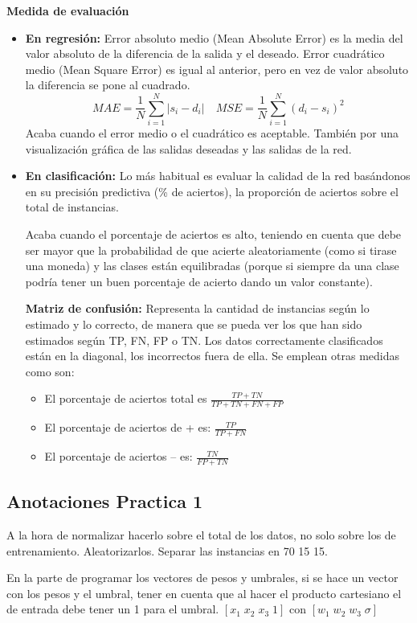 \documentclass[12pt, twoside, openright]{report} %
\begin{document}
\textbf{Medida de evaluación}
\begin{itemize}
	\item \textbf{En regresión:} Error absoluto medio (Mean Absolute Error) es la media del valor absoluto de la diferencia de la salida y el deseado. Error cuadrático medio (Mean Square Error) es igual al anterior, pero en vez de valor absoluto la diferencia se pone al cuadrado.
	      $$MAE=\frac 1 N \sum^N_{i=1} |s_i-d_i| \quad MSE=\frac 1 N \sum^N_{i=1} (d_i-s_i)^2$$
	      Acaba cuando el error medio o el cuadrático es aceptable. También por una visualización gráfica de las salidas deseadas y las salidas de la red.
	\item \textbf{En clasificación:} Lo más habitual es evaluar la calidad de la red basándonos en su precisión predictiva (\% de aciertos), la proporción de aciertos sobre el total de instancias.

	      Acaba cuando el porcentaje de aciertos es alto, teniendo en cuenta que debe ser mayor que la probabilidad de que acierte aleatoriamente (como si tirase una moneda) y las clases están equilibradas (porque si siempre da una clase podría tener un buen porcentaje de acierto dando un valor constante).

	      \textbf{Matriz de confusión:} Representa la cantidad de instancias según lo estimado y lo correcto, de manera que se pueda ver los que han sido estimados según TP, FN, FP o TN. Los datos correctamente clasificados están en la diagonal, los incorrectos fuera de ella. Se emplean otras medidas como son:
	      \begin{itemize}
		      \item El porcentaje de aciertos total es $\frac {TP+TN} {TP+TN+FN+FP}$
		      \item El porcentaje de aciertos de + es: $\frac {TP} {TP+FN}$
		      \item El porcentaje de aciertos – es: $\frac {TN} {FP+TN}$
	      \end{itemize}

\end{itemize}

\subsection{Anotaciones Practica 1}
A la hora de normalizar hacerlo sobre el total de los datos, no solo sobre los de entrenamiento.
Aleatorizarlos.
Separar las instancias en 70 15 15.

En la parte de programar los vectores de pesos y umbrales, si se hace un vector con los pesos y el umbral, tener en cuenta que al hacer el producto cartesiano el de entrada debe tener un 1 para el umbral. $[x_1 \; x_2 \; x_3 \; 1]$ con $[w_1 \; w_2 \; w_3 \; \sigma]$
\end{document}
